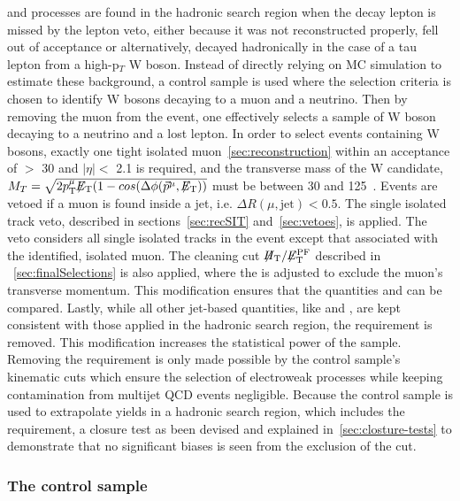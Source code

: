 \wj and \ttbar processes are found in the hadronic search region 
when the decay lepton is missed by the lepton veto, either 
because it was not reconstructed properly, fell out of acceptance 
or alternatively, decayed hadronically in the case of a tau lepton 
from a high-p$_{T}$ W boson. Instead of directly relying on MC 
simulation to estimate these background, a \mj control sample is 
used where the selection criteria is chosen to identify W bosons 
decaying to a muon and a neutrino. Then by removing the muon from 
the event, one effectively selects a sample of W boson decaying to 
a neutrino and a lost lepton. In order to select events containing 
W bosons, exactly one tight isolated muon~\ref{sec:reconstruction} 
within an acceptance of \PT $>$ 30 \gev and $|\eta| <$ 2.1 is required, 
and the transverse mass of the W candidate, 
$M_{T} = \sqrt{2p_{\mathrm{T}}^{\mu}\mbox{$\not\!\!E_\text{T}$}(1-cos(\Delta\phi(\vec{p}^{\rm  \mu},\mbox{$\not\!\!E_\text{T}$}))}$ 
must be between 30 and 125~\gev.  Events are vetoed if a muon is found inside
a jet, i.e. $\Delta R(\mu,\textrm{jet}) < 0.5$. The single isolated track 
veto, described in sections~\ref{sec:recSIT} and~\ref{sec:vetoes}, is applied. 
The veto considers all single isolated tracks in the event except 
that associated with the identified, isolated muon. The cleaning cut 
$\mbox{$\not\!\!H_\text{T}$}/\mbox{$\not\!\!E_\text{T}^{\rm PF}$}$ described in ~\ref{sec:finalSelections} is also applied, 
where the \pfmet is adjusted to exclude the muon's transverse momentum.
This modification ensures that the quantities \mht and \pfmet can be 
compared. Lastly, while all other jet-based quantities, like \scalht 
and \mht, are kept consistent with those applied in the hadronic 
search region, the \alphat requirement is removed. This modification 
increases the statistical power of the sample. Removing the \alphat 
requirement is only made possible by the control sample's kinematic 
cuts which ensure the selection of electroweak processes while keeping
contamination from multijet QCD events negligible. Because the control 
sample is used to extrapolate yields in a hadronic search region, 
which includes the \alphat requirement, a closure test as been devised 
and explained in~\ref{sec:closture-tests} to demonstrate that no 
significant biases is seen from the exclusion of the \alphat cut.

\subsubsection{The \texorpdfstring{\gj}{photon plus jets} control sample}

